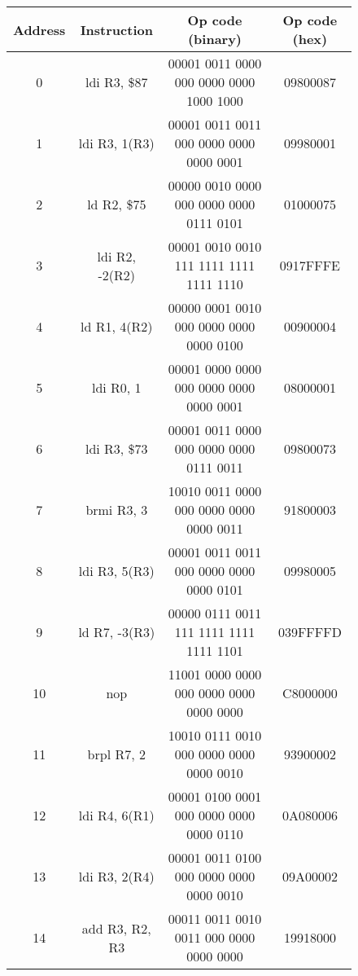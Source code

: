 \documentclass{article}
\begin{document}
    \begin{figure}[h!] \label{relevant_ram_init}
        \begin{center}
            \begin{tabular}{|c|c|c|c|}
                \hline
                Address & Instruction & Op code (binary) & Op code (hex) \\
                \hline
                0 & ldi R3, \$87 & 00001 0011 0000 000 0000 0000 1000 1000 & 09800087 \\
                \hline
                1 & ldi R3, 1(R3) & 00001 0011 0011 000 0000 0000 0000 0001 & 09980001 \\
                \hline
                2 & ld R2, \$75 & 00000 0010 0000 000 0000 0000 0111 0101 & 01000075 \\
                \hline
                3 & ldi R2, -2(R2) & 00001 0010 0010 111 1111 1111 1111 1110 & 0917FFFE \\
                \hline
                4 & ld R1, 4(R2) & 00000 0001 0010 000 0000 0000 0000 0100 & 00900004 \\
                \hline
                5 & ldi R0, 1 & 00001 0000 0000 000 0000 0000 0000 0001 & 08000001 \\
                \hline
                6 & ldi R3, \$73 & 00001 0011 0000 000 0000 0000 0111 0011 & 09800073 \\
                \hline
                7 & brmi R3, 3 & 10010 0011 0000 000 0000 0000 0000 0011 & 91800003 \\
                \hline
                8 & ldi R3, 5(R3) & 00001 0011 0011 000 0000 0000 0000 0101 & 09980005 \\
                \hline
                9 & ld R7, -3(R3) & 00000 0111 0011 111 1111 1111 1111 1101 & 039FFFFD \\
                \hline
                10 & nop & 11001 0000 0000 000 0000 0000 0000 0000 & C8000000 \\
                \hline
                11 & brpl R7, 2 & 10010 0111 0010 000 0000 0000 0000 0010 & 93900002 \\
                \hline
                12 & ldi R4, 6(R1) & 00001 0100 0001 000 0000 0000 0000 0110 & 0A080006 \\
                \hline
                13 & ldi R3, 2(R4) & 00001 0011 0100 000 0000 0000 0000 0010 & 09A00002 \\
                \hline
                14 & add R3, R2, R3 & 00011 0011 0010 0011 000 0000 0000 0000 & 19918000 \\

\end{tabular}
\end{center}
\end{figure}
\end{document}
